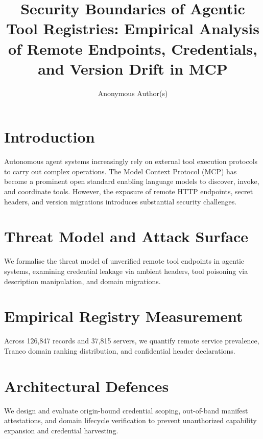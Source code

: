 \documentclass[sigconf,anonymous,review]{acmart}
\title{Security Boundaries of Agentic Tool Registries: Empirical Analysis of Remote Endpoints, Credentials, and Version Drift in MCP}
\author{Anonymous Author(s)}
\affiliation{%
  \institution{Anonymous Institution}
  \country{Anonymous Country}
}
\begin{document}
\maketitle

\section{Introduction}
Autonomous agent systems increasingly rely on external tool execution protocols to carry out complex operations. The Model Context Protocol (MCP) has become a prominent open standard enabling language models to discover, invoke, and coordinate tools. However, the exposure of remote HTTP endpoints, secret headers, and version migrations introduces substantial security challenges.

\section{Threat Model and Attack Surface}
We formalise the threat model of unverified remote tool endpoints in agentic systems, examining credential leakage via ambient headers, tool poisoning via description manipulation, and domain migrations.

\section{Empirical Registry Measurement}
Across 126,847 records and 37,815 servers, we quantify remote service prevalence, Tranco domain ranking distribution, and confidential header declarations.

\section{Architectural Defences}
We design and evaluate origin-bound credential scoping, out-of-band manifest attestations, and domain lifecycle verification to prevent unauthorized capability expansion and credential harvesting.



\end{document}
